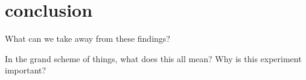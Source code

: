 \section{conclusion}

What can we take away from these findings?

In the grand scheme of things, what does this all mean? Why is this experiment important?